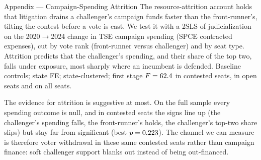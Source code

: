 
\begin{frame}{Appendix --- Campaign-Spending Attrition}
\hypertarget{app:spending}{}
\hypertarget{src:mechanism}{}
\small
The resource-attrition account holds that litigation drains a challenger's campaign funds faster than the front-runner's, tilting the contest before a vote is cast. We test it with a 2SLS of judicialization on the 2020$\to$2024 change in TSE campaign spending (SPCE contracted expenses), cut by vote rank (front-runner versus challenger) and by seat type. Attrition predicts that the challenger's spending, and their share of the top two, falls under exposure, most sharply where an incumbent is defended. Baseline controls; state FE; state-clustered; first stage $F=62.4$ in contested seats, \FinFOpen{} in open seats and \FinFFull{} on all seats.
\smallskip
\begin{center}
\scriptsize
\resizebox{\linewidth}{!}{}
\end{center}
\smallskip
\footnotesize The evidence for attrition is suggestive at most. On the full sample every spending outcome is null, and in contested seats the signs line up (the challenger's spending falls, the front-runner's holds, the challenger's top-two share slips) but stay far from significant (best $p=0.223$). The channel we can measure is therefore voter withdrawal in these same contested seats \hyperlink{src:voterballot}{} rather than campaign finance: soft challenger support blanks out instead of being out-financed. \hfill\hyperlink{app:seatdisengage}{}
\end{frame}
